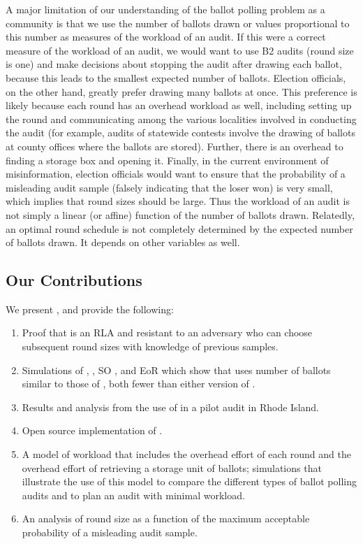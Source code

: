 A major limitation of our understanding of the ballot polling problem as a community is that we use the number of ballots drawn or values proportional to this number \cite{mclaughlin_thesis,bernhard-diss,RI-report} as measures of the workload of an audit. If this were a correct measure of the workload of an audit, we would want to use B2 audits (round size is one) and make decisions about stopping the audit after drawing each ballot, because this leads to the smallest expected number of ballots. Election officials, on the other hand, greatly prefer drawing many ballots at once. This preference is likely because each round has an overhead workload as well, including setting up the round and communicating among the various localities involved in conducting the audit (for example, audits of statewide contests involve the drawing of ballots at county offices where the ballots are stored). Further, there is an overhead to finding a storage box and opening it. Finally, in the current environment of misinformation, election officials would want to ensure that the probability of a misleading audit sample (falsely indicating that the loser won) is very small, which implies that round sizes should be large. Thus the workload of an audit is not simply a linear (or affine) function of the number of ballots drawn. Relatedly, an optimal round schedule is not completely determined by the expected number of ballots drawn. It depends on other variables as well. 

\subsection{Our Contributions}
We present \Providence, and provide the following:
\begin{enumerate}
\item Proof that \Providence is an RLA and resistant to an adversary who can choose subsequent round sizes with knowledge of previous samples.
\item Simulations of \Providence, \Minerva, SO \BRAVO, and EoR \BRAVO which show that \Providence uses number of ballots similar to those of \Minerva, both fewer than either version of \BRAVO.
\item Results and analysis from the use of \Providence in a pilot audit in Rhode Island.
\item Open source implementation of \Providence. 
\item A model of workload that includes the overhead effort of each round and the overhead effort of retrieving a storage unit of ballots; simulations that illustrate the use of this model to compare the different types of ballot polling audits and to plan an audit with minimal workload.
\item An analysis of round size as a function of the maximum acceptable probability of a misleading audit sample.
\end{enumerate}

